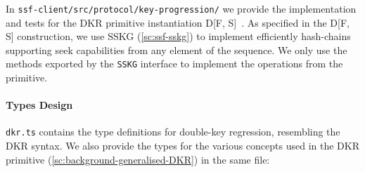 In \texttt{ssf-client/src/protocol/key-progression/} we provide
the implementation and tests for the DKR primitive instantiation
D[F, S]~\cite{GKP}. As specified in the D[F, S] construction, we use
SSKG (\cref{sc:ssf-sskg}) to implement efficiently hash-chains supporting seek capabilities from any element of the sequence. 
We only use the methods exported by the
\texttt{SSKG} interface to implement the operations from the primitive. 

\paragraph{Types Design}
\texttt{dkr.ts} contains the 
type definitions for double-key regression, resembling
the DKR syntax. We also provide the types for the various
concepts used in the DKR primitive (\cref{sc:background-generalised-DKR}) in the same file:
